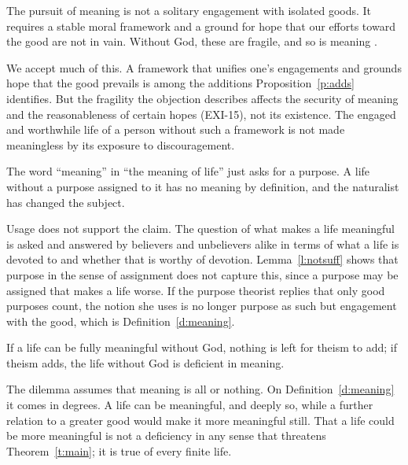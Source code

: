 \documentclass{situationist-preprint}
\begin{document}
\begin{objection}\label{o:cottingham}
The pursuit of meaning is not a solitary engagement with isolated goods. It requires a stable moral framework and a ground for hope that our efforts toward the good are not in vain. Without God, these are fragile, and so is meaning \citep{Cottingham2003}.
\end{objection}

\begin{reply}
We accept much of this. A framework that unifies one's engagements and grounds hope that the good prevails is among the additions Proposition~\ref{p:adds} identifies. But the fragility the objection describes affects the security of meaning and the reasonableness of certain hopes (EXI-15), not its existence. The engaged and worthwhile life of a person without such a framework is not made meaningless by its exposure to discouragement.
\end{reply}

\begin{objection}\label{o:concept}
The word \enquote{meaning} in \enquote{the meaning of life} just asks for a purpose. A life without a purpose assigned to it has no meaning by definition, and the naturalist has changed the subject.
\end{objection}

\begin{reply}
Usage does not support the claim. The question of what makes a life meaningful is asked and answered by believers and unbelievers alike in terms of what a life is devoted to and whether that is worthy of devotion. Lemma~\ref{l:notsuff} shows that purpose in the sense of assignment does not capture this, since a purpose may be assigned that makes a life worse. If the purpose theorist replies that only good purposes count, the notion she uses is no longer purpose as such but engagement with the good, which is Definition~\ref{d:meaning}.
\end{reply}

\begin{objection}[Instability]\label{o:instab}
If a life can be fully meaningful without God, nothing is left for theism to add; if theism adds, the life without God is deficient in meaning.
\end{objection}

\begin{reply}
The dilemma assumes that meaning is all or nothing. On Definition~\ref{d:meaning} it comes in degrees. A life can be meaningful, and deeply so, while a further relation to a greater good would make it more meaningful still. That a life could be more meaningful is not a deficiency in any sense that threatens Theorem~\ref{t:main}; it is true of every finite life.
\end{reply}
\end{document}
